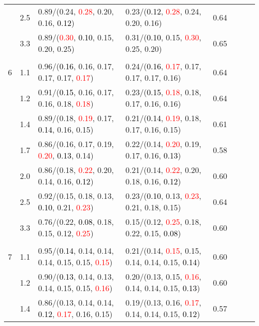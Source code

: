 \documentclass[10pt,a4paper]{report}
\begin{document}
\begin{table}[!htbp]
\begin{center}
{\begin{tabular}{ccllcccc}
			&2.5&0.89/(0.24, \textcolor{red}{0.28}, 0.20, 0.16, \textcolor{black}{0.12})&0.23/(\textcolor{black}{0.12}, \textcolor{red}{0.28}, 0.24, 0.20, 0.16)&0.64\\
			&3.3&0.89/(\textcolor{red}{0.30}, \textcolor{black}{0.10}, 0.15, 0.20, 0.25)&0.31/(\textcolor{black}{0.10}, 0.15, \textcolor{red}{0.30}, 0.25, 0.20)&0.65\\
			&&&&\\
			6			&1.1&0.96/(\textcolor{black}{0.16}, 0.16, 0.17, 0.17, 0.17, \textcolor{red}{0.17})&0.24/(\textcolor{black}{0.16}, \textcolor{red}{0.17}, 0.17, 0.17, 0.17, 0.16)&0.64\\
			&1.2&0.91/(\textcolor{black}{0.15}, 0.16, 0.17, 0.16, 0.18, \textcolor{red}{0.18})&0.23/(\textcolor{black}{0.15}, \textcolor{red}{0.18}, 0.18, 0.17, 0.16, 0.16)&0.64\\
			&1.4&0.89/(0.18, \textcolor{red}{0.19}, 0.17, \textcolor{black}{0.14}, 0.16, 0.15)&0.21/(\textcolor{black}{0.14}, \textcolor{red}{0.19}, 0.18, 0.17, 0.16, 0.15)&0.61\\
			&1.7&0.86/(0.16, 0.17, 0.19, \textcolor{red}{0.20}, \textcolor{black}{0.13}, 0.14)&0.22/(0.14, \textcolor{red}{0.20}, 0.19, 0.17, 0.16, \textcolor{black}{0.13})&0.58\\
			&2.0&0.86/(0.18, \textcolor{red}{0.22}, 0.20, 0.14, 0.16, \textcolor{black}{0.12})&0.21/(0.14, \textcolor{red}{0.22}, 0.20, 0.18, 0.16, \textcolor{black}{0.12})&0.60\\
			&2.5&0.92/(0.15, 0.18, 0.13, \textcolor{black}{0.10}, 0.21, \textcolor{red}{0.23})&0.23/(\textcolor{black}{0.10}, 0.13, \textcolor{red}{0.23}, 0.21, 0.18, 0.15)&0.64\\
			&3.3&0.76/(0.22, \textcolor{black}{0.08}, 0.18, 0.15, 0.12, \textcolor{red}{0.25})&0.15/(0.12, \textcolor{red}{0.25}, 0.18, 0.22, 0.15, \textcolor{black}{0.08})&0.60\\
			&&&&\\
			7			&1.1&0.95/(\textcolor{black}{0.14}, 0.14, 0.14, 0.14, 0.15, 0.15, \textcolor{red}{0.15})&0.21/(0.14, \textcolor{red}{0.15}, 0.15, 0.14, 0.14, 0.15, \textcolor{black}{0.14})&0.60\\
			&1.2&0.90/(\textcolor{black}{0.13}, 0.14, 0.13, 0.14, 0.15, 0.15, \textcolor{red}{0.16})&0.20/(0.13, 0.15, \textcolor{red}{0.16}, 0.14, 0.14, 0.15, \textcolor{black}{0.13})&0.60\\
			&1.4&0.86/(0.13, 0.14, 0.14, \textcolor{black}{0.12}, \textcolor{red}{0.17}, 0.16, 0.15)&0.19/(0.13, 0.16, \textcolor{red}{0.17}, 0.14, 0.14, 0.15, \textcolor{black}{0.12})&0.57\\

\end{tabular}}
\end{center}
\end{table}
\end{document}
